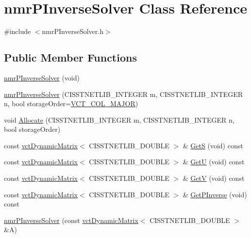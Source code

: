 \hypertarget{classnmr_p_inverse_solver}{}\section{nmr\+P\+Inverse\+Solver Class Reference}
\label{classnmr_p_inverse_solver}


{\ttfamily \#include $<$nmr\+P\+Inverse\+Solver.\+h$>$}

\subsection*{Public Member Functions}
\begin{DoxyCompactItemize}
\item 
\hyperlink{classnmr_p_inverse_solver_a9eab3e86808e546caf8ce01a99b49781}{nmr\+P\+Inverse\+Solver} (void)
\item 
\hyperlink{classnmr_p_inverse_solver_a418c9b5b28710dd71daadcd7724bf90e}{nmr\+P\+Inverse\+Solver} (C\+I\+S\+S\+T\+N\+E\+T\+L\+I\+B\+\_\+\+I\+N\+T\+E\+G\+E\+R m, C\+I\+S\+S\+T\+N\+E\+T\+L\+I\+B\+\_\+\+I\+N\+T\+E\+G\+E\+R n, bool storage\+Order=\hyperlink{vct_forward_declarations_8h_a432cdf8923afaf82f551450ad4034746}{V\+C\+T\+\_\+\+C\+O\+L\+\_\+\+M\+A\+J\+O\+R})
\item 
void \hyperlink{classnmr_p_inverse_solver_a169037ffcb1c25890f78dd3e72e26cd9}{Allocate} (C\+I\+S\+S\+T\+N\+E\+T\+L\+I\+B\+\_\+\+I\+N\+T\+E\+G\+E\+R m, C\+I\+S\+S\+T\+N\+E\+T\+L\+I\+B\+\_\+\+I\+N\+T\+E\+G\+E\+R n, bool storage\+Order)
\item 
const \hyperlink{classvct_dynamic_matrix}{vct\+Dynamic\+Matrix}$<$ C\+I\+S\+S\+T\+N\+E\+T\+L\+I\+B\+\_\+\+D\+O\+U\+B\+L\+E $>$ \& \hyperlink{classnmr_p_inverse_solver_ae834714f4d26fc0aa967a736c0458846}{Get\+S} (void) const 
\item 
const \hyperlink{classvct_dynamic_matrix}{vct\+Dynamic\+Matrix}$<$ C\+I\+S\+S\+T\+N\+E\+T\+L\+I\+B\+\_\+\+D\+O\+U\+B\+L\+E $>$ \& \hyperlink{classnmr_p_inverse_solver_ab0f0b5fbb27a4a2d985f5d4eda8ca3a0}{Get\+U} (void) const 
\item 
const \hyperlink{classvct_dynamic_matrix}{vct\+Dynamic\+Matrix}$<$ C\+I\+S\+S\+T\+N\+E\+T\+L\+I\+B\+\_\+\+D\+O\+U\+B\+L\+E $>$ \& \hyperlink{classnmr_p_inverse_solver_af1ef358eae9a68c2187e61b12216d9c2}{Get\+V} (void) const 
\item 
const \hyperlink{classvct_dynamic_matrix}{vct\+Dynamic\+Matrix}$<$ C\+I\+S\+S\+T\+N\+E\+T\+L\+I\+B\+\_\+\+D\+O\+U\+B\+L\+E $>$ \& \hyperlink{classnmr_p_inverse_solver_ac84bcd21764592228112e059154cda0f}{Get\+P\+Inverse} (void) const 
\end{DoxyCompactItemize}
{\bf }\par
\begin{DoxyCompactItemize}
\item 
\hyperlink{classnmr_p_inverse_solver_acabdec40373b7508a5972e5fa6a51dc4}{nmr\+P\+Inverse\+Solver} (const \hyperlink{classvct_dynamic_matrix}{vct\+Dynamic\+Matrix}$<$ C\+I\+S\+S\+T\+N\+E\+T\+L\+I\+B\+\_\+\+D\+O\+U\+B\+L\+E $>$ \&A)
\end{DoxyCompactItemize}

